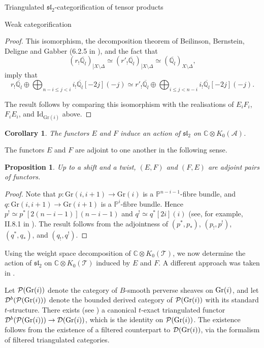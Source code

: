 \documentclass[12pt]{amsart}
\newtheorem{cor}[thm]{Corollary}
\newtheorem{prpn}[thm]{Proposition}
\theoremstyle{definition}
\theoremstyle{remark}
\theoremstyle{remark}
\begin{document}
\begin{section}{Triangulated $\mathfrak{sl}_{2}$-categorification of tensor products}
\begin{subsection}{Weak categorification}
\begin{proof}
This isomorphism, the decomposition theorem of Beilinson, Bernstein, Deligne and Gabber (6.2.5 in \cite{BeilinsonBernsteinDeligneFaisceauxPervers}), and the fact that \[ (r_{!} \overline{\mathbb{Q}_{l}})_{\left| X \setminus \Delta \right.} \simeq (r'_{!} \overline{\mathbb{Q}_{l}})_{\left| X \setminus \Delta \right.} \simeq (\overline{\mathbb{Q}_{l}})_{X \setminus \Delta}, \] imply that \[ r_{!} \overline{\mathbb{Q}_{l}} \oplus \bigoplus_{n-i \leq j < i} i_{!} \overline{\mathbb{Q}_{l}}[-2j](-j) \simeq  r'_{!} \overline{\mathbb{Q}_{l}} \oplus \bigoplus_{i \leq j < n-i} i_{!} \overline{\mathbb{Q}_{l}}[-2j](-j). \]

The result follows by comparing this isomorphism with the realisations of $E_{i}F_{i}$, $F_{i}E_{i}$, and $\text{Id}_{\text{Gr}(i)}$ above. 
\end{proof}

\begin{cor} The functors $E$ and $F$ induce an action of $\mathfrak{sl}_{2}$ on $\mathbb{C} \otimes K_{0}(\mathcal{A})$. \end{cor}

The functors $E$ and $F$ are adjoint to one another in the following sense.

\begin{prpn} \label{UngradAdj} Up to a shift and a twist, $(E,F)$ and $(F,E)$ are adjoint pairs of functors. \end{prpn}

\begin{proof} Note that $p \colon \text{Gr}(i,i+1) \rightarrow \text{Gr}(i)$ is a $\mathbb{P}^{n-i-1}$-fibre bundle, and $q \colon \text{Gr}(i,i+1) \rightarrow \text{Gr}(i+1)$ is a $\mathbb{P}^{i}$-fibre bundle. Hence $p^{!} \simeq p^{*}[2(n-i-1)](n-i-1)$ and $q^{!} \simeq q^{*}[2i](i)$ (see, for example, II.8.1 in \cite{KiehlWeissauerWeilConjecturesPerverseSheaveslAdicFourierTransform}). The result follows from the adjointness of $(p^{*},p_{*})$, $(p_{!},p^{!})$, $(q^{*},q_{*})$, and $(q_{!},q^{!})$. 
 \end{proof}
 
Using the weight space decomposition of $\mathbb{C} \otimes K_{0}(\mathcal{T})$, we now determine the action of $\mathfrak{sl}_{2}$ on $\mathbb{C} \otimes K_{0}(\mathcal{T})$ induced by $E$ and $F$. A different approach was taken in \cite{ZhengGeometricCategorificationTensorProducts}.

Let $\mathcal{P}({\rm Gr}(i))$ denote the category of $B$-smooth perverse sheaves on ${\rm Gr}(i)$, and let $\mathcal{D}^{b}(\mathcal{P}({\rm Gr}(i)))$ denote the bounded derived category of $\mathcal{P}({\rm Gr}(i))$ with its standard $t$-structure. There exists (see \cite{BeilinsonDerivedCategoryPerverseSheaves}) a canonical $t$-exact triangulated functor $\mathcal{D}^{b}(\mathcal{P}({\rm Gr}(i))) \rightarrow \mathcal{D}({\rm Gr}(i))$, which is the identity on $\mathcal{P}({\rm Gr}(i))$. The existence follows from the existence of a filtered counterpart to $\mathcal{D}({\rm Gr}(i))$, via the formalism of filtered triangulated categories.


\end{subsection}
\end{section}
\end{document}
